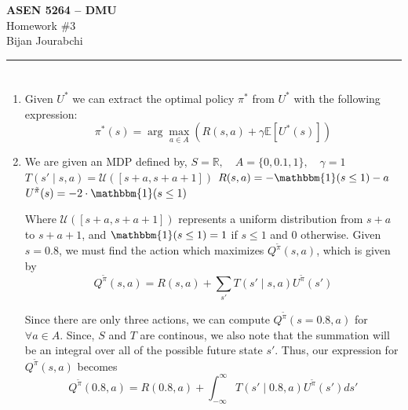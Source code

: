 \documentclass[11pt]{article}
\newcommand{\course}{ASEN 5264 -- DMU}
\newcommand{\assignment}{Homework \#3}
\newcommand{\studentname}{Bijan Jourabchi}
\begin{document}
\begin{center}
    {\LARGE \textbf{\course}} \\[6pt]
    {\Large \assignment} \\[10pt]
    \studentname \\
\end{center}

\vspace{1em}
\hrule
\vspace{1em}



\section{}

\begin{enumerate}[label=\alph*)]
    \item
    Given $U^*$ we can extract the optimal policy $\pi^*$ from $U^*$ with the following expression:
    \[
        \pi^*(s) = \arg\max_{a \in A}(R(s,a) + \gamma \mathbb{E}[U^*(s)])
    \]
    \item
    We are given an MDP defined by, \newline
    $S = \mathbb{R},  \quad A = \{0,0.1,1\}, \quad \gamma = 1$ \newline
    $T(s' \mid s,a) = \mathcal{U}([s+a,s+a+1])$ \newline
    $R(s,a) = -\mathbbm{1}(s \leq 1) - a$ \newline
    $U^{\tilde{\pi}}(s) = -2\cdot\mathbbm{1}(s \leq 1)$

    Where $\mathcal{U}([s+a,s+a+1])$ represents a uniform distribution from $s+a$ to $s+a+1$, and $\mathbbm{1}(s \leq 1)
    = 1$ if $s \leq 1$ and $0$ otherwise. Given $s = 0.8$, we must find the action which maximizes $Q^{\tilde{\pi}}(s,a)$,
    which is given by
    \[
        Q^{\tilde{\pi}}(s,a) = R(s,a) + \sum_{s'} T(s' \mid s,a)U^{\tilde{\pi}}(s')
    \]

    Since there are only three actions, we can compute $Q^{\tilde{\pi}}(s=0.8,a)$ for $\forall a \in A$. Since, $S$ and $T$ are continous,
    we also note that the summation will be an integral over all of the possible future state $s'$. Thus, our expression for $Q^{\tilde{\pi}}(s,a)$
    becomes 
    \[
        Q^{\tilde{\pi}}(0.8,a) = R(0.8,a) + \int_{-\infty}^{\infty} T(s' \mid 0.8,a)U^{\tilde{\pi}}(s') ds'
    \]


\end{enumerate}
\end{document}
